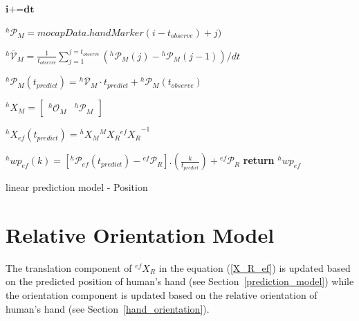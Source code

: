 \begin{algorithm}[H] \label{positionalgo}
	\DontPrintSemicolon
	
	
	
	\textit{$\textbf{i+=dt}$} 
	
	{
		{
			${}^{h}\mathcal{P}_M= \textit{mocapData}.handMarker(i-t_{observe})+j)$	
		}
		
		${}^{h}\mathcal{\bar{V}}_{M} = \frac{1}{t_{observe}}{\sum_{j=1}^{j=t_{observe}} ({}^{h}\mathcal{P}_{M}(j)-{}^{h}\mathcal{P}_{M}(j-1))/dt }$\newline 
		
		${}^{h}\mathcal{P}_M(t_{predict}) = {}^{h}\mathcal{\bar{V}}_{M} \cdot t_{predict}  + {}^{h}\mathcal{P}_{M}(t_{observe})$ %
		
		
		${}^{h}{X}_M= \begin{bmatrix} {}^{h}\mathcal{O}_{M} &  {}^{h}\mathcal{P}_M	\end{bmatrix}$ \newline
		
		${}^{h}{X}_{ef}(t_{predict}) =  {}^{h}{X}_M  {}^{M}{X}_R {{}^{ef}{X}_R}^{-1}$ \newline
		
		
		{
			{
				${}^{h}wp_{ef}(k) = [{}^{h}\mathcal{P}_{ef}(t_{predict}) - {}^{ef}\mathcal{P}_{R}] . (\frac{k}{t_{predict}})  + {}^{ef}\mathcal{P}_{R} $ 
			}	
			\textbf{return} $ {}^{h}wp_{ef} $
		}
	}
	\caption{linear prediction model - Position}
\end{algorithm}


\clearpage
\section{Relative Orientation Model}\label{relOri}
The translation component of ${}^{ef}{X}_R $ in the equation (\ref{X_R_ef}) is updated based on the predicted position of human's hand (see Section~\ref{prediction_model}) while the orientation component is updated based on the relative orientation of human's hand (see Section~\ref{hand_orientation}).

